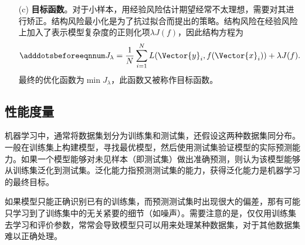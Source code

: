 \begin{itemize}
  \item[(c)] \textbf{目标函数}。对于小样本，用经验风险估计期望经常不太理想，需要对其进行矫正。结构风险最小化是为了抗过拟合而提出的策略。结构风险在经验风险上加入了表示模型复杂度的正则化项$\lambda J(f)$，因此结构方程为
  \begin{equation}\adddotsbeforeeqnnum
    \label{eq:ml_loss_structure}
    J_{\lambda}=\frac{1}{N}\sum_{i=1}^{N}L(\Vector{y}_i,f(\Vector{x}_i))+\lambda J(f).
  \end{equation}
  最终的优化函数为$\min J_{\lambda}$，此函数又被称作目标函数。
\end{itemize}

\subsection{性能度量}\label{sec:ml_performance}

机器学习中，通常将数据集划分为训练集和测试集，还假设这两种数据集同分布。一般在训练集上构建模型，寻找最优模型，然后使用测试集验证模型的实际预测能力。如果一个模型能够对未见样本（即测试集）做出准确预测，则认为该模型能够从训练集泛化到测试集。泛化能力指预测测试集的能力，获得泛化能力是机器学习的最终目标。

如果模型只能正确识别已有的训练集，而预测测试集时出现很大的偏差，那有可能只学习到了训练集中的无关紧要的细节（如噪声）。需要注意的是，仅仅用训练集去学习和评价参数，常常会导致模型只可以用来处理某种数据集，对于其他数据集难以正确处理。

